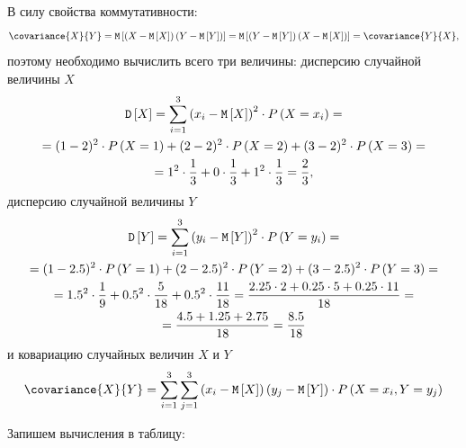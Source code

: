 \documentclass[12pt,a4paper]{article}
\begin{document}
\begin{enumerate}
        В силу свойства коммутативности:
        \begin{equation}
            \covariance{X}{Y}
            = \expectation{\left ( X - \expectation{X} \right ) \left ( Y - \expectation{Y} \right )}
            = \expectation{\left ( Y - \expectation{Y} \right ) \left ( X - \expectation{X} \right )}
            = \covariance{Y}{X} ,
        \end{equation}
        поэтому необходимо вычислить всего три величины: дисперсию случайной величины $X$
        \begin{multline}
            \mathtt{D} \left [ X \right ]
            = \sum_{i=1}^3 \left ( x_i - \mathtt{M} \left [ X \right ] \right )^2 \cdot P \left ( X=x_i \right ) = \\
            = ( 1 - 2 )^2 \cdot P \left ( X=1 \right ) + ( 2 - 2 )^2 \cdot P \left ( X=2 \right ) + ( 3 - 2 )^2 \cdot P \left ( X=3 \right ) = \\
            = 1^2 \cdot \frac{1}{3} + 0 \cdot \frac{1}{3} + 1^2 \cdot \frac{1}{3} = \frac{2}{3},
        \end{multline}
        дисперсию случайной величины $Y$
        \begin{multline}
            \mathtt{D} \left [ Y \right ]
            = \sum_{i=1}^3 \left ( y_i - \mathtt{M} \left [ Y \right ] \right )^2 \cdot P \left ( Y=y_i \right ) = \\
            = ( 1 - 2.5 )^2 \cdot P \left ( Y=1 \right ) + ( 2 - 2.5 )^2 \cdot P \left ( Y=2 \right ) + ( 3 - 2.5 )^2 \cdot P \left ( Y=3 \right ) = \\
            = 1.5^2 \cdot \frac{1}{9} + 0.5^2 \cdot \frac{5}{18} + 0.5^2 \cdot \frac{11}{18}
            = \frac{2.25 \cdot 2 + 0.25 \cdot 5 + 0.25 \cdot 11}{18} = \\
            = \frac{4.5 + 1.25 + 2.75}{18}
            = \frac{8.5}{18}
        \end{multline}
        и ковариацию случайных величин $X$ и $Y$
        \begin{equation}
            \covariance{X}{Y} = \sum_{i=1}^3 \sum_{j=1}^3 \left ( x_i - \expectation{X} \right ) \left ( y_j - \expectation{Y} \right ) \cdot \probability{X=x_i, Y=y_j}
        \end{equation}

        Запишем вычисления в таблицу:


\end{enumerate}
\end{document}
